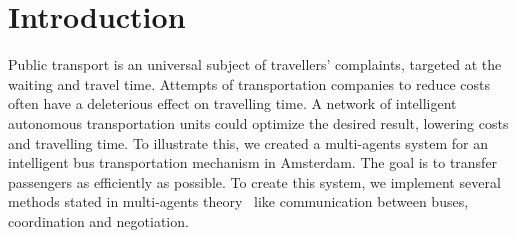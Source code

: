 \section{Introduction}

Public transport is an universal subject of travellers' complaints, targeted at the waiting and travel time. Attempts of transportation companies to reduce costs often have a deleterious effect on travelling time. A network of intelligent autonomous transportation units could optimize the desired result, lowering costs and travelling time. To illustrate this, we created a multi-agents system for an intelligent bus transportation mechanism in Amsterdam. The goal is to transfer passengers as efficiently as possible. To create this system, we implement several methods stated in multi-agents theory~\cite{intromultiagentsystems} like communication between buses, coordination and negotiation. 
